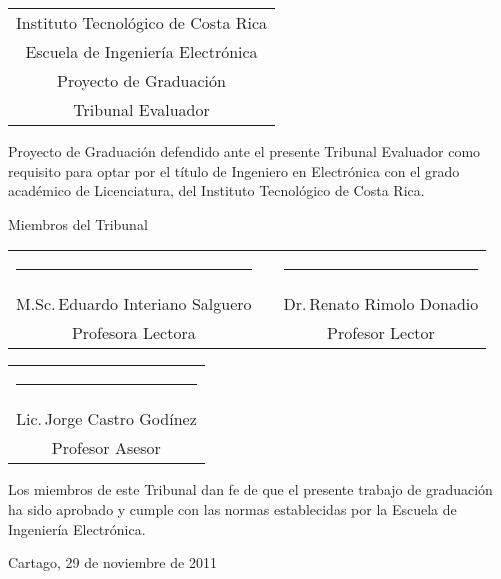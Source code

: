 \thispagestyle{empty}

\newcommand{\lectorI}{M.Sc.\,Eduardo Interiano Salguero}
\newcommand{\lectorII}{Dr.\,Renato Rimolo Donadio}
\newcommand{\director}{Lic.\,Jorge Castro God\'{i}nez}


\begin{center}
  \begin{tabular}{c}
    Instituto Tecnológico de Costa Rica \\
    Escuela de Ingeniería Electrónica \\
    Proyecto de Graduación \\
    Tribunal Evaluador
  \end{tabular}
\end{center}

\vfill

Proyecto de Graduación defendido ante el presente Tribunal Evaluador como 
requisito para optar por el título de Ingeniero en Electrónica con el grado 
académico de Licenciatura, del Instituto Tecnológico de Costa Rica.  

\vfill

\vspace*{20mm}
\begin{center}
 Miembros del Tribunal
\end{center}
\vspace*{8mm}

\vfill

\begin{center}
  \begin{tabular}{ccc}
    \rule{70mm}{0.5pt} & \rule{15mm}{0pt} & \rule{70mm}{0.5pt} \\
    \lectorI && \lectorII \\
    Profesora Lectora && Profesor Lector
  \end{tabular}
  
  \vspace{10mm}

  \begin{tabular}{c}
    \rule{6cm}{0.5pt} \\
    \director \\
    Profesor Asesor
  \end{tabular}
\end{center}

\vfill


Los miembros de este Tribunal dan fe de que el presente trabajo de graduación
ha sido aprobado y cumple con las normas establecidas por la Escuela de
Ingeniería Electrónica.

\vfill

\begin{center}
  Cartago, 29 de noviembre de 2011\par
\end{center}

\cleardoublepage

